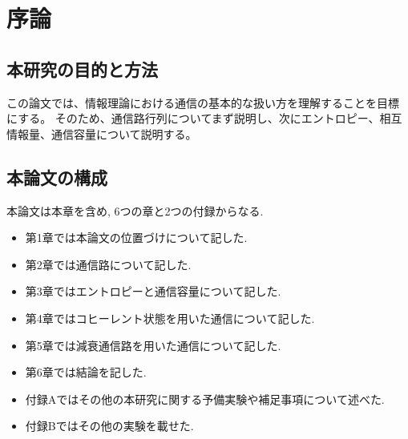 \chapter{序論}

\section{本研究の目的と方法}
この論文では、情報理論における通信の基本的な扱い方を理解することを目標にする。
そのため、通信路行列についてまず説明し、次にエントロピー、相互情報量、通信容量について説明する。

\section{本論文の構成}
本論文は本章を含め, 6つの章と2つの付録からなる.
\begin{itemize}
	\item 第1章では本論文の位置づけについて記した.
	\item 第2章では通信路について記した.
	\item 第3章ではエントロピーと通信容量について記した.
	\item 第4章ではコヒーレント状態を用いた通信について記した.
	\item 第5章では減衰通信路を用いた通信について記した.
 	\item 第6章では結論を記した.
	\item 付録Aではその他の本研究に関する予備実験や補足事項について述べた.
	\item 付録Bではその他の実験を載せた.
\end{itemize}